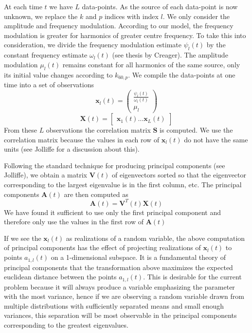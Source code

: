 \documentclass[letterpaper,12pt]{report}
\begin{document}
At each time $t$ we have $L$ data-points. As the source of each data-point is
now unknown, we replace the $k$ and $p$ indices with index $l$. We only consider
the amplitude and frequency modulation. According to our model, the frequency
modulation is greater for harmonics of greater centre frequency. To take this
into consideration, we divide the frequency modulation estimate $\psi_{l}(t)$ by
the constant frequency estimate $\omega_{l}(t)$ (see thesis by Creager).  The amplitude modulation
$\mu_{l}(t)$ remains constant for all harmonics of the same source, only its initial value
changes according to $k_{60,p}$.  We compile the data-points at one time into a
set of observations
\begin{equation}
    \mathbf{x}_{l}(t) = \begin{pmatrix}
        \frac{\psi_{l}(t)}{\omega_{l}(t)} \\
        \mu_{l}
    \end{pmatrix}
\end{equation}
\begin{equation}
    \mathbf{X}(t) = \begin{bmatrix}
        \mathbf{x}_{1}(t) \ldots \mathbf{x}_{L}(t)
    \end{bmatrix}
\end{equation}
From these $L$ observations the correlation matrix $\mathbf{S}$ is computed. We
use the correlation matrix because the values in each row of $\mathbf{x}_{l}(t)$ do
not have the same units (see Jolliffe for a discussion about this). 

Following the standard technique for producing principal components (see
Jolliffe), we obtain a matrix $\mathbf{V}(t)$ of eigenvectors sorted so that the
eigenvector corresponding to the largest eigenvalue is in the first column, etc.
The principal components $\mathbf{A}(t)$ are then computed as
\begin{equation}
    \mathbf{A}(t) = \mathbf{V}^{T}(t)\mathbf{X}(t)
\end{equation}
We have found it sufficient to use only the first principal component and
therefore only use the values in the first row of $\mathbf{A}(t)$

If we see the $\mathbf{x}_{l}(t)$ as realizations of a random variable, the
above computation of principal components has the effect of projecting
realizations of $\mathbf{x}_{l}(t)$ to points $a_{1,l}(t)$ on a 1-dimensional
subspace. It is a fundamental theory of principal components that the
transformation above maximizes the expected euclidean distance between the
points $a_{1,l}(t)$. This is desirable for the current problem because it will
always produce a variable emphasizing the parameter with the most variance,
hence if we are observing a random variable drawn from multiple distributions
with sufficiently separated means and small enough variances, this separation
will be most observable in the principal components corresponding to the
greatest eigenvalues.
\end{document}
